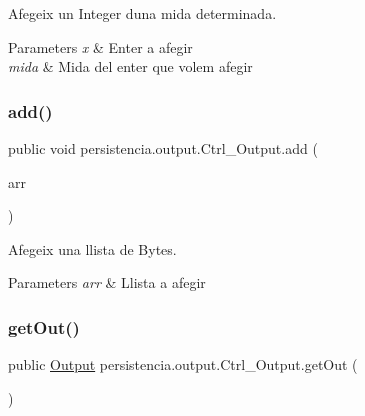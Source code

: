 Afegeix un Integer d\textquotesingle{}una mida determinada. 


\begin{DoxyParams}{Parameters}
{\em x} & Enter a afegir \\
\hline
{\em mida} & Mida del enter que volem afegir \\
\hline
\end{DoxyParams}
\mbox{\label{classpersistencia_1_1output_1_1Ctrl__Output_a5fb2f07198a77b4fac0f95ee48e3d0b9}} 
\subsubsection{\texorpdfstring{add()}{add()}\hspace{0.1cm}{\footnotesize\ttfamily [6/6]}}
{\footnotesize\ttfamily public void persistencia.\+output.\+Ctrl\+\_\+\+Output.\+add (\begin{DoxyParamCaption}\item[{Array\+List$<$ Byte $>$}]{arr }\end{DoxyParamCaption})\hspace{0.3cm}{\ttfamily [inline]}}



Afegeix una llista de Bytes. 


\begin{DoxyParams}{Parameters}
{\em arr} & Llista a afegir \\
\hline
\end{DoxyParams}
\mbox{\label{classpersistencia_1_1output_1_1Ctrl__Output_aa36fdf4d9efc14d95f5d0d77838c6280}} 
\subsubsection{\texorpdfstring{get\+Out()}{getOut()}}
{\footnotesize\ttfamily public \hyperlink{classpersistencia_1_1output_1_1Output}{Output} persistencia.\+output.\+Ctrl\+\_\+\+Output.\+get\+Out (\begin{DoxyParamCaption}{ }\end{DoxyParamCaption})\hspace{0.3cm}{\ttfamily [inline]}}

